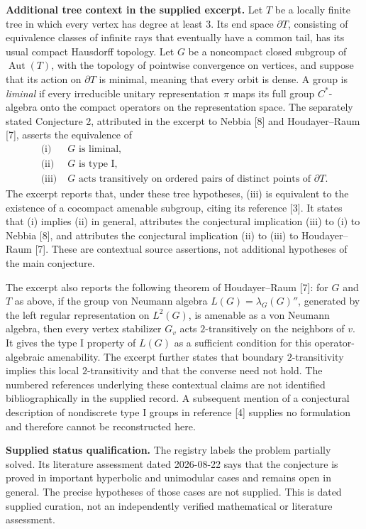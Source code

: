 \documentclass[11pt]{article}
\begin{document}
\textbf{Additional tree context in the supplied excerpt.} Let \(T\) be a locally finite tree in which every vertex has degree at least \(3\). Its end space \(\partial T\), consisting of equivalence classes of infinite rays that eventually have a common tail, has its usual compact Hausdorff topology. Let \(G\) be a noncompact closed subgroup of \(\operatorname{Aut}(T)\), with the topology of pointwise convergence on vertices, and suppose that its action on \(\partial T\) is minimal, meaning that every orbit is dense. A group is \emph{liminal} if every irreducible unitary representation \(\pi\) maps its full group \(C^*\)-algebra onto the compact operators on the representation space. The separately stated Conjecture 2, attributed in the excerpt to Nebbia [8] and Houdayer--Raum [7], asserts the equivalence of
\[
\begin{aligned}
\text{(i)}\;&G\text{ is liminal},\\
\text{(ii)}\;&G\text{ is type I},\\
\text{(iii)}\;&G\text{ acts transitively on ordered pairs of distinct points of }\partial T.
\end{aligned}
\]
The excerpt reports that, under these tree hypotheses, (iii) is equivalent to the existence of a cocompact amenable subgroup, citing its reference [3]. It states that (i) implies (ii) in general, attributes the conjectural implication (iii) to (i) to Nebbia [8], and attributes the conjectural implication (ii) to (iii) to Houdayer--Raum [7]. These are contextual source assertions, not additional hypotheses of the main conjecture.

The excerpt also reports the following theorem of Houdayer--Raum [7]: for \(G\) and \(T\) as above, if the group von Neumann algebra \(L(G)=\lambda_G(G)''\), generated by the left regular representation on \(L^2(G)\), is amenable as a von Neumann algebra, then every vertex stabilizer \(G_v\) acts \(2\)-transitively on the neighbors of \(v\). It gives the type I property of \(L(G)\) as a sufficient condition for this operator-algebraic amenability. The excerpt further states that boundary \(2\)-transitivity implies this local \(2\)-transitivity and that the converse need not hold. The numbered references underlying these contextual claims are not identified bibliographically in the supplied record. A subsequent mention of a conjectural description of nondiscrete type I groups in reference [4] supplies no formulation and therefore cannot be reconstructed here.

\textbf{Supplied status qualification.} The registry labels the problem partially solved. Its literature assessment dated 2026-08-22 says that the conjecture is proved in important hyperbolic and unimodular cases and remains open in general. The precise hypotheses of those cases are not supplied. This is dated supplied curation, not an independently verified mathematical or literature assessment.
\end{document}
